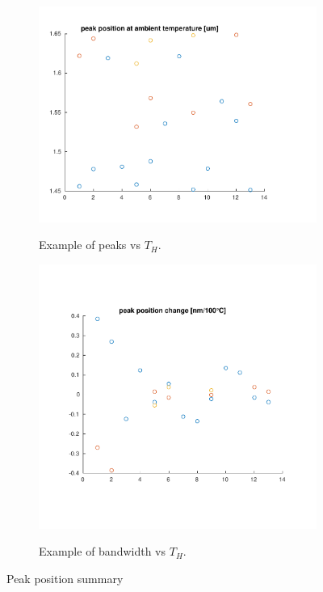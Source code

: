 \documentclass[12pt,a4paper,twoside]{article}
\begin{document}
\begin{figure}[h!]
	\centering
	\begin{subfigure}[b]{0.45\textwidth}
		\includegraphics[width=1\textwidth]{ppaat2.pdf}
		\label{fig_sym_pp@t2} 	%
		\caption{Example of peaks vs $T_H$.}
	\end{subfigure}\hspace{.05\textwidth}
	\begin{subfigure}[b]{0.45\textwidth}
		\includegraphics[width=1\textwidth]{ppc2.pdf}
		\label{fig_sym_ppc2} %
		\caption{Example of bandwidth vs $T_H$.}
	\end{subfigure}
	\caption{Peak position summary}
	\label{fig_sym_pp}
\end{figure}
\end{document}
